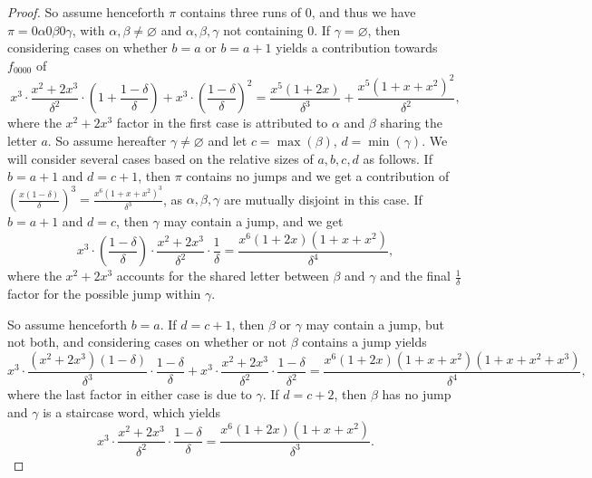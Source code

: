 \documentclass{article}
\theoremstyle{remark}
\theoremstyle{plain}
\begin{document}
\begin{proof}
So assume henceforth $\pi$ contains three runs of 0, and thus we have $\pi=0\alpha0\beta0\gamma$, with $\alpha,\beta \neq \varnothing$ and $\alpha,\beta,\gamma$ not containing 0.  If $\gamma=\varnothing$, then considering cases on whether $b=a$ or $b=a+1$ yields a contribution towards $f_{0000}$ of
$$x^3\cdot\frac{x^2+2x^3}{\delta^2}\cdot\left(1+\frac{1-\delta}{\delta}\right)+x^3\cdot\left(\frac{1-\delta}{\delta}\right)^2=\frac{x^5(1+2x)}{\delta^3}+\frac{x^5(1+x+x^2)^2}{\delta^2},$$
where the $x^2+2x^3$ factor in the first case is attributed to $\alpha$ and $\beta$ sharing the letter $a$.  So assume hereafter $\gamma\neq \varnothing$ and let $c=\max(\beta)$, $d=\min(\gamma)$.  We will consider several cases based on the relative sizes of $a,b,c,d$ as follows. If $b=a+1$ and $d=c+1$, then $\pi$ contains no jumps and we get a contribution of $\left(\frac{x(1-\delta)}{\delta}\right)^3=\frac{x^6(1+x+x^2)^3}{\delta^3}$, as $\alpha,\beta,\gamma$ are mutually disjoint in this case.  If $b=a+1$ and $d=c$, then $\gamma$ may contain a jump, and we get $$x^3\cdot\left(\frac{1-\delta}{\delta}\right)\cdot\frac{x^2+2x^3}{\delta^2}\cdot\frac{1}{\delta}=\frac{x^6(1+2x)(1+x+x^2)}{\delta^4},$$
where the $x^2+2x^3$ accounts for the shared letter between $\beta$ and $\gamma$ and the final $\frac{1}{\delta}$ factor for the possible jump within $\gamma$.

So assume henceforth $b=a$.  If $d=c+1$, then $\beta$ or $\gamma$ may contain a jump, but not both, and considering cases on whether or not $\beta$ contains a jump yields
$$x^3\cdot\frac{(x^2+2x^3)(1-\delta)}{\delta^3}\cdot \frac{1-\delta}{\delta}+x^3\cdot\frac{x^2+2x^3}{\delta^2}\cdot\frac{1-\delta}{\delta^2}=\frac{x^6(1+2x)(1+x+x^2)(1+x+x^2+x^3)}{\delta^4},$$
where the last factor in either case is due to $\gamma$. If $d=c+2$, then $\beta$ has no jump and $\gamma$ is a staircase word, which yields
$$x^3\cdot\frac{x^2+2x^3}{\delta^2}\cdot\frac{1-\delta}{\delta}=\frac{x^6(1+2x)(1+x+x^2)}{\delta^3}.$$


\end{proof}
\end{document}
